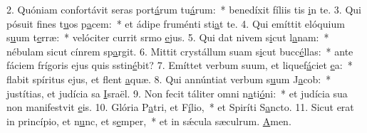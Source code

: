 2. Quóniam confortávit seras port\uline{á}rum tu\uline{á}rum:~* benedíxit fíliis tis \uline{i}n te.
3. Qui pósuit fines t\uline{u}os p\uline{a}cem:~* et ádipe fruménti sti\uline{a}t te.
4. Qui emíttit elóquium s\uline{u}um t\uline{e}rræ:~* velóciter currit srmo \uline{e}jus.
5. Qui dat nivem s\uline{i}cut l\uline{a}nam:~* nébulam sicut cínrem sp\uline{a}rgit.
6. Mittit crystállum suam s\uline{i}cut bucc\uline{é}llas:~* ante fáciem frígoris ejus quis sstin\uline{é}bit?
7. Emíttet verbum suum, et liquef\uline{á}ciet \uline{e}a:~* flabit spíritus ejus, et flent \uline{a}quæ.
8. Qui annúntiat verbum s\uline{u}um J\uline{a}cob:~* justítias, et judícia sa \uline{I}sraël.
9. Non fecit táliter omni n\uline{a}ti\uline{ó}ni:~* et judícia sua non manifestvit \uline{e}is.
10. Glória P\uline{a}tri, et F\uline{í}lio,~* et Spiríti S\uline{a}ncto.
11. Sicut erat in princípio, et n\uline{u}nc, et s\uline{e}mper,~* et in sǽcula sæculrum. \uline{A}men.
